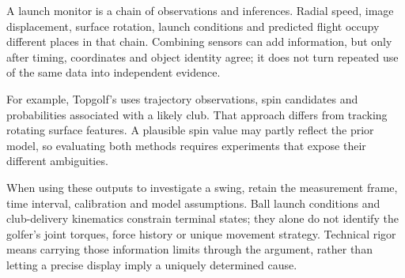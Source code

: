 \begin{keypoint}
A launch monitor is a chain of observations and inferences. Radial speed,
image displacement, surface rotation, launch conditions and predicted
flight occupy different places in that chain. Combining sensors can add
information, but only after timing, coordinates and object identity agree;
it does not turn repeated use of the same data into independent evidence.

For example, Topgolf's  uses trajectory observations, spin candidates and probabilities associated with a likely club.
That approach differs from tracking rotating surface features.
A plausible spin value may partly reflect the prior model, so evaluating both methods requires experiments that expose their different ambiguities.

When using these outputs to investigate a swing, retain the measurement
frame, time interval, calibration and model assumptions. Ball launch conditions
and club-delivery kinematics constrain terminal states; they alone do not
identify the golfer's joint torques, force history or unique movement strategy. Technical rigor
means carrying those information limits through the argument, rather
than letting a precise display imply a uniquely determined cause.
\end{keypoint}
